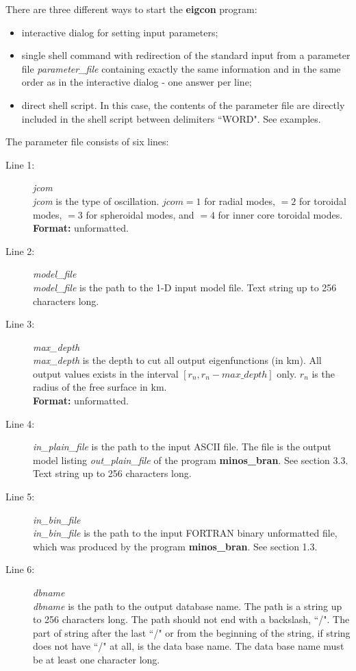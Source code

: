 \noindent There are three different ways to start the {\bf eigcon} program:
\begin{itemize}
\item interactive dialog for setting input parameters;
\item single shell command with redirection of the standard input from a parameter
file {\it parameter\_file} containing exactly the same information and
in the same order as in the interactive dialog - one answer per line;
\item direct shell script. In this case, the contents of the parameter file are
directly included in the shell script between delimiters ``WORD". See examples.
\end{itemize}
\noindent The parameter file consists of six lines:
\begin{description}
\item[Line 1:] {\it jcom} \\
{\it jcom} is the type of oscillation.  $jcom=1$ for radial modes, $=2$ for
  toroidal modes, $=3$ for spheroidal modes, and $=4$ for inner core toroidal
  modes. \\
  {\bf Format:} unformatted.
\item[Line 2:] {\it model\_file} \\
  {\it model\_file} is the path to the 1-D input model file. Text string up to
  256 characters long.
\item[Line 3:] {\it max\_depth}\\
  {\it max\_depth} is the depth to cut all output eigenfunctions (in km). All output
  values exists in the interval $[r_n,r_n - max\_depth]$ only. $r_n$ is the radius
  of the  free surface in km. \\
  {\bf Format:} unformatted.
\item[Line 4:] {\it in\_plain\_file} is the path to the input ASCII file. 
  The file is the output model listing  {\it out\_plain\_file} of the
  program {\bf minos\_bran}. See section 3.3.
  Text string up to 256 characters long.
\item[Line 5:] {\it in\_bin\_file} \\
  {\it in\_bin\_file} is the  path to the input FORTRAN binary unformatted file,
which was produced by the program {\bf minos\_bran}.
 See section 1.3.
\item[Line 6:] {\it dbname} \\
  {\it dbname} is the path to the output database name. The path is a string up to 256
  characters long. The path should not
  end with a backslash, ``/". The part of string after the last ``/" or from the
  beginning of the string, if string does not have ``/" at all, is the
  data base name. The data base name must be at least one character long.
\end{description}
%
%
